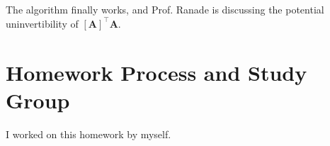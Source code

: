 \documentclass[]{article}
\newcommand{\tpose}[1]{\left[#1\right]^{\! \top} \!\!}
\begin{document}
\subsection{}

The algorithm finally works, and Prof. Ranade is discussing the potential uninvertibility of \(\tpose{\bm{A}} \bm{A}\). 


\section{Homework Process and Study Group}

I worked on this homework by myself. 

\newpage



\end{document}

